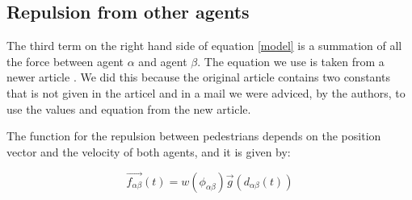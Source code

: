 % 
% 
% 



\subsection{Repulsion from other agents}
The third term on the right hand side of equation \eqref{model} is a summation of all the 
force between agent $\alpha$ and agent $\beta$. The equation we use is taken from a newer article \cite{ABconstant}. We did this because the original article contains two constants that is not given in the articel and in a mail we were adviced, by the authors, to use the values and equation from the new article. 

The function for the repulsion between pedestrians depends on the position vector and the velocity of 
both agents, and it is given by:

\begin{equation}
        \vec{f_{\alpha \beta }}\left( t \right) = w\left(\phi_{\alpha \beta}\right)\vec{g}\left(d_{\alpha \beta}(t)\right)
    \label{eq:agentinteraction}
\end{equation}

